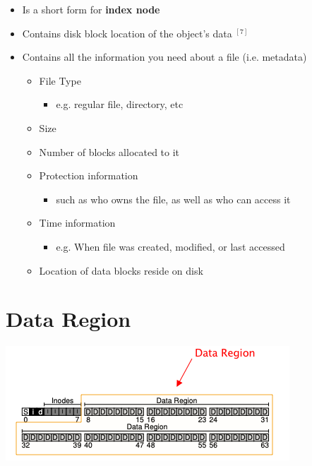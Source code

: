 \documentclass[12pt]{article}
\begin{document}
\begin{itemize}
    \item Is a short form for \textbf{index node}
    \item Contains disk block location of the object's data $^{[7]}$
    \item Contains all the information you need about a file (i.e. metadata)

    \begin{itemize}
        \item File Type
        \begin{itemize}
            \item e.g. regular file, directory, etc
        \end{itemize}
        \item Size
        \item Number of blocks allocated to it
        \item Protection information
        \begin{itemize}
            \item such as who owns the file, as well as who can access it
        \end{itemize}
        \item Time information
        \begin{itemize}
            \item e.g. When file was created, modified, or last accessed
        \end{itemize}
        \item Location of data blocks reside on disk
    \end{itemize}
\end{itemize}

\section*{Data Region}

\begin{center}
\includegraphics[width=\linewidth]{images/midterm_2_solution_24.png}
\end{center}
\end{document}
